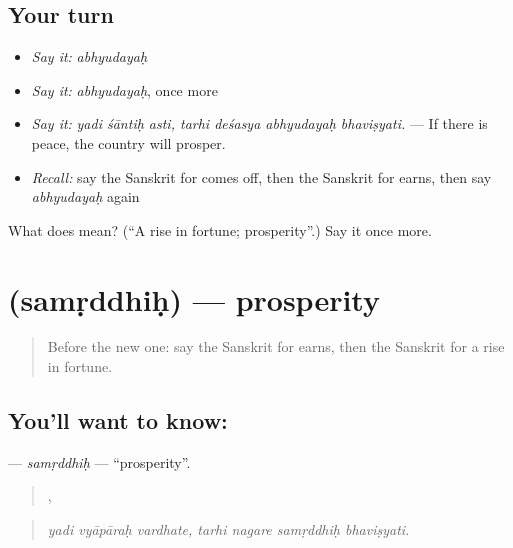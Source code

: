 \subsection*{Your turn}
\begin{itemize}
\raggedright
  \item \emph{Say it:} \emph{abhyudayaḥ}
  \item \emph{Say it:} \emph{abhyudayaḥ}, once more
  \item \emph{Say it:} \emph{yadi śāntiḥ asti, tarhi deśasya abhyudayaḥ bhaviṣyati.} — If there is peace, the country will prosper.
  \item \emph{Recall:} say the Sanskrit for comes off, then the Sanskrit for earns, then say \emph{abhyudayaḥ} again
\end{itemize}

\begin{tcolorbox}[breakable,colback=teal!4,colframe=teal!35!black,title={Before you move on}]
What does  mean? (\textquotedblleft{}A rise in fortune; prosperity\textquotedblright{}.) Say it once more.
\end{tcolorbox}
\section[\texorpdfstring{\sk{समृद्धिः} (samṛddhiḥ)}{समृद्धिः (samṛddhiḥ)}]{ (samṛddhiḥ) — prosperity}

\label{lesson:SA-C386-samrddhih}



\begin{quote}
Before the new one: say the Sanskrit for earns, then the Sanskrit for a rise in fortune.
\end{quote}

\subsection*{You'll want to know: }
\textbf{} — \emph{samṛddhiḥ} — \textquotedblleft{}prosperity\textquotedblright{}.

\begin{quote}
  ,    
\end{quote}

\begin{quote}
\emph{yadi vyāpāraḥ vardhate, tarhi nagare samṛddhiḥ bhaviṣyati.}
\end{quote}

